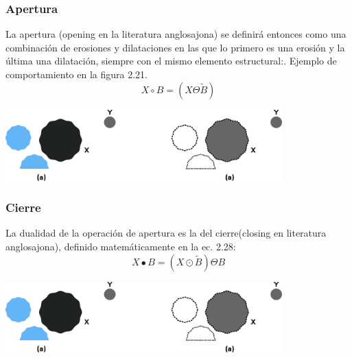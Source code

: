 \subsubsection{Apertura}
La
apertura (opening en la literatura anglosajona) se definirá entonces como una
combinación de erosiones y dilataciones en las que lo primero es una erosión y la última
una dilatación, siempre con el mismo elemento estructural:\cite{Book:Jose2005}. Ejemplo de comportamiento
en la figura 2.21.
\begin{equation}
	X \circ B = (X \Theta \tilde{B})
\end{equation}
\begin{center}
	\includegraphics[width=0.8\textwidth]{Contenido/Cuerpo/Capitulo2/Fig16.eps}
	\label{fig:MarcoTeorico:Fig24}
\end{center}

\subsubsection{Cierre}
La dualidad de la operación de apertura es la del cierre(closing en literatura anglosajona), definido matemáticamente en la ec. 2.28:
\begin{equation}
	X  \bullet B = (X \odot \tilde{B}) \Theta B
\end{equation}

\begin{center}
	\includegraphics[width=0.8\textwidth]{Contenido/Cuerpo/Capitulo2/Fig16.eps}
	\label{fig:MarcoTeorico:Fig25}
\end{center}


